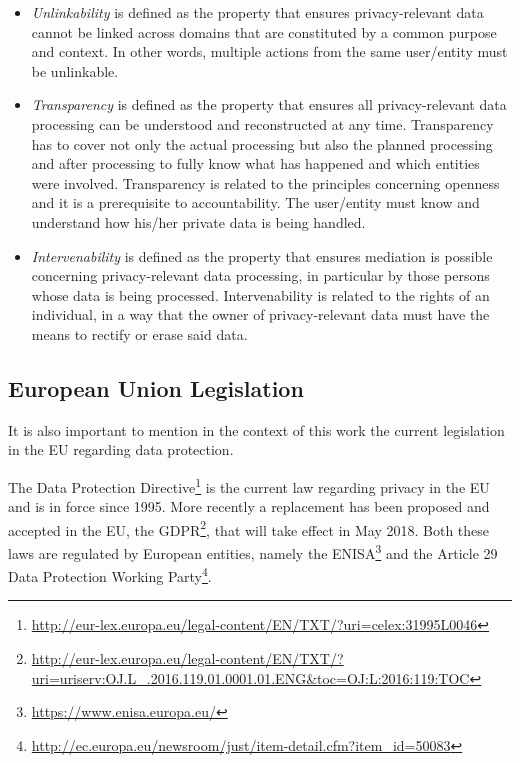 \begin{itemize}
\setlength\itemsep{1em}


\item \textit{Unlinkability} is defined as the property that ensures privacy-relevant data cannot be linked across domains that are constituted by a common purpose and context. In other words, multiple actions from the same user/entity must be unlinkable.

\item \textit{Transparency} is defined as the property that ensures all privacy-relevant data processing can be understood and reconstructed at any time. Transparency has to cover not only the actual processing but also the planned processing and after processing to fully know what has happened and which entities were involved. Transparency is related to the principles concerning openness and it is a prerequisite to accountability. The user/entity must know and understand how his/her private data is being handled.

\item \textit{Intervenability} is defined as the property that ensures mediation is possible concerning privacy-relevant data processing, in particular by those persons whose data is being processed. Intervenability is related to the rights of an individual, in a way that the owner of privacy-relevant data must have the means to rectify or erase said data.

\end{itemize}


\subsection{European Union Legislation}
\label{ssec:EuropeanUnionLegislation}

It is also important to mention in the context of this work the current legislation in the \ac{EU} regarding data protection.

 The Data Protection Directive\footnote{\url{http://eur-lex.europa.eu/legal-content/EN/TXT/?uri=celex:31995L0046}} is the current law regarding privacy in the \ac{EU} and is in force since 1995.
More recently a replacement has been proposed and accepted in the \ac{EU}, the \ac{GDPR}\footnote{\url{http://eur-lex.europa.eu/legal-content/EN/TXT/?uri=uriserv:OJ.L_.2016.119.01.0001.01.ENG&toc=OJ:L:2016:119:TOC}}, that will take effect in May 2018. Both these laws are regulated by European entities, namely the \ac{ENISA}\footnote{\url{https://www.enisa.europa.eu/}} and the Article 29 Data Protection Working Party\footnote{\url{http://ec.europa.eu/newsroom/just/item-detail.cfm?item_id=50083}}.



